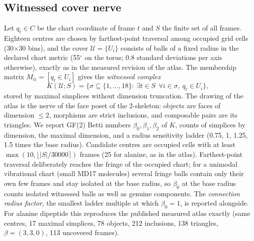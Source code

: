 \documentclass[11pt]{article}
\newcommand{\U}{\mathcal{U}}
\begin{document}
\subsection{Witnessed cover nerve}
Let $q_t\in C$ be the chart coordinate of frame $t$ and $S$ the finite set of all frames. Eighteen centres are chosen by farthest-point traversal among occupied grid cells (30$\times$30 bins), and the cover $\U=\{U_i\}$ consists of balls of a fixed radius in the declared chart metric (55$^\circ$ on the torus; 0.8 standard deviations per axis otherwise), exactly as in the measured revision of the atlas. The membership matrix $M_{ti}=[q_t\in U_i]$ gives the \emph{witnessed complex}
\[
K(\U;S)=\{\sigma\subseteq\{1,\dots,18\}:\ \exists t\in S\ \ \forall i\in\sigma,\ q_t\in U_i\},
\]
stored by maximal simplices without dimension truncation. The drawing of the atlas is the nerve of the face poset of the 2-skeleton: objects are faces of dimension $\le2$, morphisms are strict inclusions, and composable pairs are its triangles. We report GF(2) Betti numbers $\beta_0,\beta_1,\beta_2$ of $K$, counts of simplices by dimension, the maximal dimension, and a radius sensitivity ladder (0.75, 1, 1.25, 1.5 times the base radius). Candidate centres are occupied cells with at least $\max(10,\lfloor|S|/30000\rceil)$ frames (25 for alanine, as in the atlas). Farthest-point traversal deliberately reaches the fringe of the occupied chart; for a unimodal vibrational chart (small MD17 molecules) several fringe balls contain only their own few frames and stay isolated at the base radius, so $\beta_0$ at the base radius counts isolated witnessed balls as well as genuine components. The \emph{connection radius factor}, the smallest ladder multiple at which $\beta_0=1$, is reported alongside. For alanine dipeptide this reproduces the published measured atlas exactly (same centres, 17 maximal simplices, 78 objects, 212 inclusions, 138 triangles, $\beta=(3,3,0)$, 113 uncovered frames).
\end{document}

